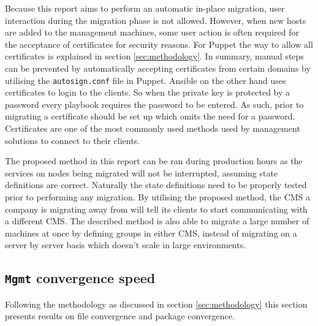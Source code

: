 Because this report aims to perform an automatic in-place migration, user interaction during the migration phase is not allowed. However, when new hosts are added to the management machines, some user action is often required for the acceptance of certificates for security reasons. For Puppet the way to allow all certificates is explained in section \ref{sec:methodology}. In summary, manual steps can be prevented by automatically accepting certificates from certain domains by utilising the \texttt{autosign.conf} file in Puppet. Ansible on the other hand uses certificates to login to the clients. So when the private key is protected by a password every playbook requires the password to be entered. As such, prior to migrating a certificate should be set up which omits the need for a password. Certificates are one of the most commonly used methods used by management solutions to connect to their clients. 

The proposed method in this report can be ran during production hours as the services on nodes being migrated will not be interrupted, assuming state definitions are correct. Naturally the state definitions need to be properly tested prior to performing any migration. By utilising the proposed method, the CMS a company is migrating away from will tell its clients to start communicating with a different CMS. The described method is also able to migrate a large number of machines at once by defining groups in either CMS, instead of migrating on a server by server basis which doesn't scale in large environments.

\subsection{\texttt{Mgmt} convergence speed}
Following the methodology as discussed in section \ref{sec:methodology} this section presents results on file convergence and package convergence. 

